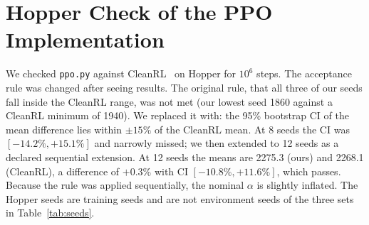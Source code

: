 \documentclass[conference]{IEEEtran}
\begin{document}
\section{Hopper Check of the PPO Implementation}\label{app:hopper}
We checked \texttt{ppo.py} against CleanRL~\cite{huang2022cleanrl} on Hopper for $10^6$ steps. %
The acceptance rule was changed after seeing results.
The original rule, that all three of our seeds fall inside the CleanRL range, was not met (our lowest seed 1860 against a CleanRL minimum of 1940). %
We replaced it with: the 95\% bootstrap CI of the mean difference lies within $\pm15\%$ of the CleanRL mean. %
At 8 seeds the CI was $[-14.2\%,+15.1\%]$ and narrowly missed; we then extended to 12 seeds as a declared sequential extension. %
At 12 seeds the means are 2275.3 (ours) and 2268.1 (CleanRL), a difference of $+0.3\%$ with CI $[-10.8\%,+11.6\%]$, which passes. %
Because the rule was applied sequentially, the nominal $\alpha$ is slightly inflated. %
The Hopper seeds are training seeds and are not environment seeds of the three sets in Table~\ref{tab:seeds}.



\end{document}
